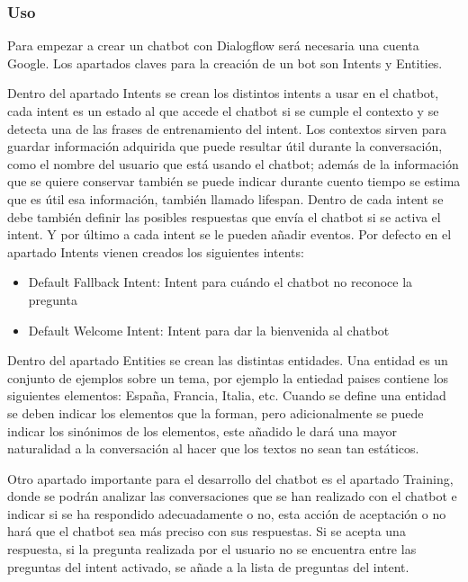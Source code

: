 \subsubsection*{Uso}

Para empezar a crear un chatbot con Dialogflow será necesaria una cuenta Google. Los apartados claves para la creación de un bot son Intents y Entities.

Dentro del apartado Intents se crean los distintos intents a usar en el chatbot, cada intent es un estado al que accede el chatbot si se cumple el contexto y se detecta una de las frases de entrenamiento del intent. Los contextos sirven para guardar información adquirida que puede resultar útil durante la conversación, como el nombre del usuario que está usando el chatbot; además de la información que se quiere conservar también se puede indicar durante cuento tiempo se estima que es útil esa información, también llamado lifespan. Dentro de cada intent se debe también definir las posibles respuestas que envía el chatbot si se activa el intent. Y por último a cada intent se le pueden añadir eventos. Por defecto en el apartado Intents vienen creados los siguientes intents:

\begin{itemize}
    \item Default Fallback Intent: Intent para cuándo el chatbot no reconoce la pregunta
    \item Default Welcome Intent: Intent para dar la bienvenida al chatbot
\end{itemize}

Dentro del apartado Entities se crean las distintas entidades. Una entidad es un conjunto de ejemplos sobre un tema, por ejemplo la entiedad paises contiene los siguientes elementos: España, Francia, Italia, etc. Cuando se define una entidad se deben indicar los elementos que la forman, pero adicionalmente se puede indicar los sinónimos de los elementos, este añadido le dará una mayor naturalidad a la conversación al hacer que los textos no sean tan estáticos.

Otro apartado importante para el desarrollo del chatbot es el apartado Training, donde se podrán analizar las conversaciones que se han realizado con el chatbot e indicar si se ha respondido adecuadamente o no, esta acción de aceptación o no hará que el chatbot sea más preciso con sus respuestas. Si se acepta una respuesta, si la pregunta realizada por el usuario no se encuentra entre las preguntas del intent activado, se añade a la lista de preguntas del intent.

